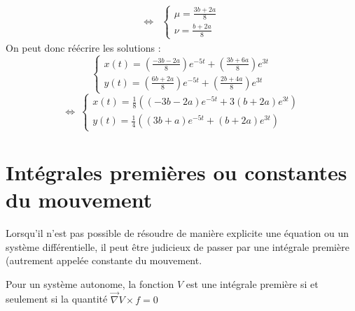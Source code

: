 \begin{ex}
\begin{align*}
    \Leftrightarrow & \begin{cases}\mu = \frac{3b+2a}{8}\\\nu=\frac{b+2a}{8}
    \end{cases}
\end{align*}
On peut donc réécrire les solutions :
$$\begin{cases}
x(t)=\left( \frac{-3b-2a}{8} \right)e^{-5t}+\left( \frac{3b+6a}{8} \right)e^{3t}\\
y(t)=\left(\frac{6b+2a}{8}\right)e^{-5t}+\left(\frac{2b+4a}{8}\right)e^{3t}
\end{cases}$$
$$\Leftrightarrow\ \begin{cases}x(t)=\frac{1}{8}\left(\left(-3b-2a\right)e^{-5t}+3\left(b+2a\right)e^{3t}\right)\\y(t)=\frac{1}{4}\left(\left(3b+a\right)e^{-5t}+\left(b+2a\right)e^{3t}\right)\end{cases}$$
\end{ex}
\section{Intégrales premières ou constantes du mouvement}
Lorsqu'il n'est pas possible de résoudre de manière explicite une équation ou un système différentielle, il peut être judicieux de passer par une intégrale première (autrement appelée constante du mouvement.
\begin{defi}
Pour un système autonome, la fonction $V$ est une intégrale première si et seulement si la quantité $\overrightarrow{\nabla}V\times f=0$
\end{defi}



